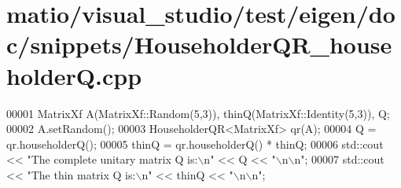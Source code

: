 \hypertarget{matio_2visual__studio_2test_2eigen_2doc_2snippets_2_householder_q_r__householder_q_8cpp_source}{}\section{matio/visual\+\_\+studio/test/eigen/doc/snippets/\+Householder\+Q\+R\+\_\+householderQ.cpp}
\label{matio_2visual__studio_2test_2eigen_2doc_2snippets_2_householder_q_r__householder_q_8cpp_source}

\begin{DoxyCode}
00001 MatrixXf A(MatrixXf::Random(5,3)), thinQ(MatrixXf::Identity(5,3)), Q;
00002 A.setRandom();
00003 HouseholderQR<MatrixXf> qr(A);
00004 Q = qr.householderQ();
00005 thinQ = qr.householderQ() * thinQ;
00006 std::cout << \textcolor{stringliteral}{"The complete unitary matrix Q is:\(\backslash\)n"} << Q << \textcolor{stringliteral}{"\(\backslash\)n\(\backslash\)n"};
00007 std::cout << \textcolor{stringliteral}{"The thin matrix Q is:\(\backslash\)n"} << thinQ << \textcolor{stringliteral}{"\(\backslash\)n\(\backslash\)n"};
\end{DoxyCode}
